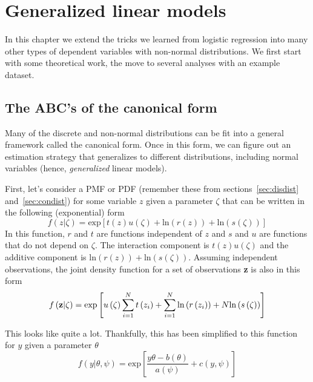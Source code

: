 


\chapter{Generalized linear models}
\label{sec:chapterglm}

In this chapter we extend the tricks we learned from logistic regression into many other types of dependent variables with non-normal distributions. We first start with some theoretical work, the move to several analyses with an example dataset.

\section{The ABC's of the canonical form}

Many of the discrete and non-normal distributions can be fit into a general framework called the canonical form. Once in this form, we can figure out an estimation strategy that generalizes to different distributions, including normal variables (hence, {\it generalized} linear models).

First, let's consider a PMF or PDF (remember these from sections~\ref{sec:disdist} and~\ref{sec:condist}) for some variable $z$ given a parameter $\zeta$ that can be written in the following (exponential) form
\begin{equation}
f\left(z|\zeta\right)=\mbox{exp}\left[t\left(z\right)u\left(\zeta\right)+\mbox{ln}\left(r\left(z\right)\right)+\mbox{ln}\left(s\left(\zeta\right)\right)\right]
\end{equation}
In this function, $r$ and $t$ are functions independent of $z$ and $s$ and $u$ are functions that do not depend on $\zeta$. The interaction component is $t\left(z\right)u\left(\zeta\right)$ and the additive component is $\mbox{ln}\left(r\left(z\right)\right)+\mbox{ln}\left(s\left(\zeta\right)\right)$. Assuming independent observations, the joint density function for a set of observations {\bf z} is also in this form
\begin{equation}
f\left({\bf z}|\zeta\right)=\mbox{exp}\left[ u\left(\zeta\right) \sum_{i=1}^{N}t\left(z_i\right)+\sum_{i=1}^N\mbox{ln}\left(r\left(z_i\right)\right)+N\mbox{ln}\left(s\left(\zeta\right)\right)\right]
\end{equation}

This looks like quite a lot. Thankfully, this has been simplified to this function for $y$ given a parameter $\theta$
\begin{equation}\label{eq:canonical}
f\left(y|\theta,\psi\right) = \mbox{exp}\left[\frac{y\theta-b\left(\theta\right)}{a\left(\psi\right)}+c\left(y,\psi\right)\right]
\end{equation}

